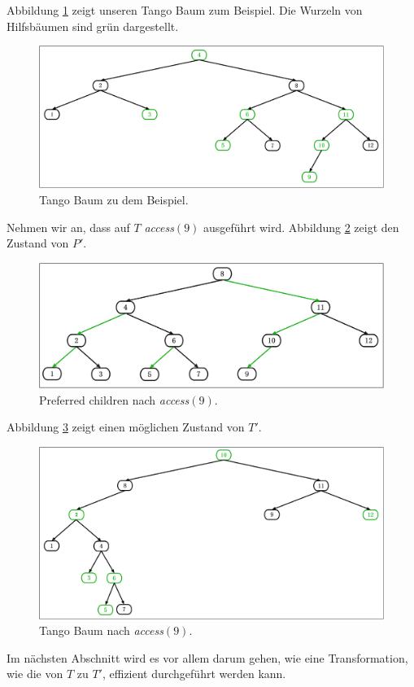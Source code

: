 \documentclass[a4paper,12pt]{article}
\begin{document}
\noindent Abbildung \ref{fig:Tangobaum} zeigt unseren Tango Baum zum Beispiel. Die Wurzeln von Hilfsbäumen sind grün dargestellt.

\begin{figure}[H]
	\centering
	\includegraphics[width=1\textwidth]{"Medien/Tango/Tangobaum"}
	\caption{Tango Baum zu dem Beispiel. }
	\label{fig:Tangobaum}
\end{figure}
\noindent Nehmen wir an, dass auf $T$ \textit{access}$\left(9\right)$ ausgeführt wird. Abbildung \ref{fig:prefChilds2} zeigt den Zustand von $P'$.

\begin{figure}[H]
	\centering
	\includegraphics[width=1\textwidth]{"Medien/Tango/prefChilds2"}
	\caption{Preferred children nach  \textit{access}$\left(9\right)$. }
	\label{fig:prefChilds2}
\end{figure}

\noindent Abbildung \ref{fig:Tangobaum2} zeigt einen möglichen Zustand von $T'$.
\begin{figure}[H]
	\centering
	\includegraphics[width=1\textwidth]{"Medien/Tango/Tangobaum2"}
	\caption{Tango Baum nach  \textit{access}$\left(9\right)$. }
	\label{fig:Tangobaum2}
\end{figure}
\noindent Im nächsten Abschnitt wird es vor allem darum gehen, wie eine Transformation, wie die von $T$ zu $T'$, effizient durchgeführt werden kann.
\end{document}
